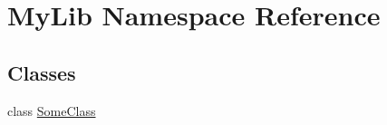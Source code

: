 \hypertarget{namespace_my_lib}{}\section{My\+Lib Namespace Reference}
\label{namespace_my_lib}
\subsection*{Classes}
\begin{DoxyCompactItemize}
\item 
class \mbox{\hyperlink{class_my_lib_1_1_some_class}{Some\+Class}}
\end{DoxyCompactItemize}

